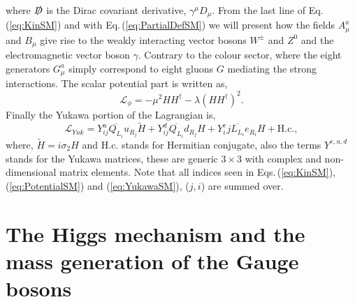 where $\slashed{D}$ is the Dirac covariant derivative, $\gamma^\mu D_\mu$. From the last line of Eq.\,(\ref{eq:KinSM}) and with Eq.\,(\ref{eq:PartialDefSM}) we will present how the fields $A^a_\mu$ and $B_\mu$ give rise to the weakly interacting vector bosons $W^\pm$ and $Z^0$ and the electromagnetic vector boson $\gamma$. Contrary to the colour sector, where the eight generators $G^a_\mu$ simply correspond to eight gluons $G$ mediating the strong interactions.
%
The scalar potential part is written as, 
%
\begin{equation}
\label{eq:PotentialSM}
\mathcal{L}_{\phi} = -\mu^2 H H^\dagger - \lambda (H H^\dagger)^2 .
\end{equation}
Finally the Yukawa portion of the Lagrangian is, 
\begin{equation}
\label{eq:YukawaSM}
\mathcal{L}_{Yuk} = Y^u_{ij} \overline{Q_{L_i}} u_{R_j}  \tilde{H} + Y^d_{ij} \overline{Q_{L_i}}  d_{R_j} H  + Y^e_ij \overline{L_{L_i}}  e_{R_i} H + \text{H.c.},
\end{equation}
%
where, $\tilde{H}=i\sigma_2 H$ and H.c. stands for Hermitian conjugate, also the terms $Y^{e,u,d}$ stands for the Yukawa matrices, these are generic $3\times3$ with complex and non-dimensional matrix elements. Note that all indices seen in Eqs.\,(\ref{eq:KinSM}), (\ref{eq:PotentialSM}) and (\ref{eq:YukawaSM}), ($j,i$) are summed over. 

%
%


\renewcommand{\cleardoublepage}{}
\renewcommand{\clearpage}{}

\section{The Higgs mechanism and the mass generation of the Gauge bosons}

